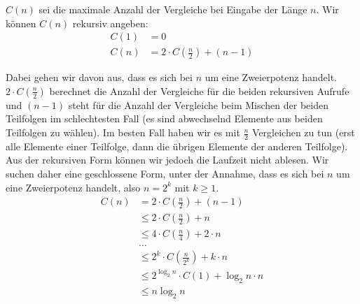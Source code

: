 \begin{Lza}[Mergesort]
\hspace{\parindent}$C(n)$ sei die maximale Anzahl der Vergleiche bei Eingabe der Länge $n$. Wir können $C(n)$ rekursiv angeben:
\begin{align*}
  C(1) &= 0\\
  C(n) &= 2 \cdot C(\frac{n}{2}) + (n-1)
\end{align*}

Dabei gehen wir davon aus, dass es sich bei $n$ um eine Zweierpotenz handelt. $2 \cdot C(\frac{n}{2})$ berechnet die Anzahl der Vergleiche für die beiden rekursiven Aufrufe und $(n-1)$ steht für die Anzahl der Vergleiche beim Mischen der beiden Teilfolgen im schlechtesten Fall (es sind abwechselnd Elemente aus beiden Teilfolgen zu wählen). Im besten Fall haben wir es mit $\frac{n}{2}$ Vergleichen zu tun (erst alle Elemente einer Teilfolge, dann die übrigen Elemente der anderen Teilfolge). Aus der rekursiven Form können wir jedoch die Laufzeit nicht ablesen. Wir suchen daher eine geschlossene Form, unter der Annahme, dass es sich bei $n$ um eine Zweierpotenz handelt, also $n=2^k$ mit $k \ge 1$.
\begin{align*}
  C(n) &= 2 \cdot C(\frac{n}{2}) + (n-1)\\
       &\le 2 \cdot C(\frac{n}{2}) + n\\
       &\le 4 \cdot C(\frac{n}{4}) + 2 \cdot n\\
       &\ldots\\
       &\le 2^k \cdot C(\frac{n}{2^k}) + k \cdot n \\
       &\le 2^{\log_2 n} \cdot C(1) + \log_2 n \cdot n\\
       &\le n \log_2 n
\end{align*}
\end{Lza}


